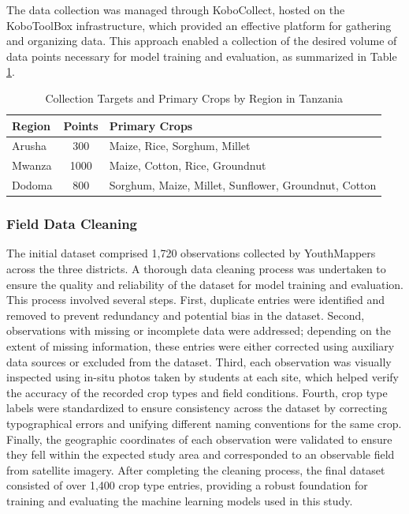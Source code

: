 \documentclass[
  journal,
  twocolumn]{IEEEtran}
\begin{document}
The data collection was managed through KoboCollect, hosted on the
KoboToolBox infrastructure, which provided an effective platform for
gathering and organizing data. This approach enabled a collection of the
desired volume of data points necessary for model training and
evaluation, as summarized in Table \ref{tab:data_n}.

\begin{table}[h!]
\centering
\small
\begin{tabular}{@{}lcp{4.5cm}@{}}
\toprule
\textbf{Region} & \textbf{Points} & \textbf{Primary Crops} \\
\midrule
Arusha & 300 & Maize, Rice, Sorghum, Millet \\
\midrule
Mwanza & 1000 & Maize, Cotton, Rice, Groundnut \\
\midrule
Dodoma & 800 & Sorghum, Maize, Millet, Sunflower, Groundnut, Cotton \\
\bottomrule
\end{tabular}
\caption{Collection Targets and Primary Crops by Region in Tanzania}
\label{tab:data_n}
\end{table}

\hypertarget{field-data-cleaning}{%
\subsubsection{Field Data Cleaning}\label{field-data-cleaning}}

The initial dataset comprised 1,720 observations collected by
YouthMappers across the three districts. A thorough data cleaning
process was undertaken to ensure the quality and reliability of the
dataset for model training and evaluation. This process involved several
steps. First, duplicate entries were identified and removed to prevent
redundancy and potential bias in the dataset. Second, observations with
missing or incomplete data were addressed; depending on the extent of
missing information, these entries were either corrected using auxiliary
data sources or excluded from the dataset. Third, each observation was
visually inspected using in-situ photos taken by students at each site,
which helped verify the accuracy of the recorded crop types and field
conditions. Fourth, crop type labels were standardized to ensure
consistency across the dataset by correcting typographical errors and
unifying different naming conventions for the same crop. Finally, the
geographic coordinates of each observation were validated to ensure they
fell within the expected study area and corresponded to an observable
field from satellite imagery. After completing the cleaning process, the
final dataset consisted of over 1,400 crop type entries, providing a
robust foundation for training and evaluating the machine learning
models used in this study.
\end{document}
